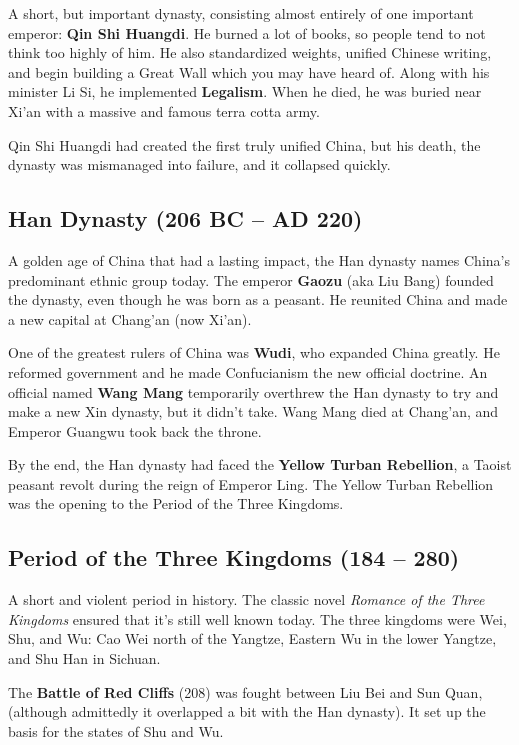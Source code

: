 A short, but important dynasty, consisting almost entirely of one important emperor: \textbf{Qin Shi Huangdi}.
He burned a lot of books, so people tend to not think too highly of him.
He also standardized weights, unified Chinese writing,
and begin building a Great Wall which you may have heard of.
Along with his minister Li Si, he implemented \textbf{Legalism}.
When he died, he was buried near Xi'an with a massive and famous terra cotta army.

Qin Shi Huangdi had created the first truly unified China,
but his death, the dynasty was mismanaged into failure, and it collapsed quickly.

\subsection*{Han Dynasty (206 BC -- AD 220)}

A golden age of China that had a lasting impact, the Han dynasty names China's predominant ethnic group today.
The emperor \textbf{Gaozu} (aka Liu Bang) founded the dynasty, even though he was born as a peasant.
He reunited China and made a new capital at Chang'an (now Xi'an).

One of the greatest rulers of China was \textbf{Wudi}, who expanded China greatly.
He reformed government and he made Confucianism the new official doctrine.
An official named \textbf{Wang Mang} temporarily overthrew the Han dynasty
to try and make a new Xin dynasty, but it didn't take.
Wang Mang died at Chang'an, and Emperor Guangwu took back the throne.

By the end, the Han dynasty had faced the \textbf{Yellow Turban Rebellion},
a Taoist peasant revolt during the reign of Emperor Ling.
The Yellow Turban Rebellion was the opening to the Period of the Three Kingdoms.

\subsection*{Period of the Three Kingdoms (184 -- 280)}

A short and violent period in history.
The classic novel \textit{Romance of the Three Kingdoms} ensured that it's still well known today.
The three kingdoms were Wei, Shu, and Wu:
Cao Wei north of the Yangtze,
Eastern Wu in the lower Yangtze,
and Shu Han in Sichuan.

The \textbf{Battle of Red Cliffs} (208) was fought between Liu Bei and Sun Quan,
(although admittedly it overlapped a bit with the Han dynasty).
It set up the basis for the states of Shu and Wu.


